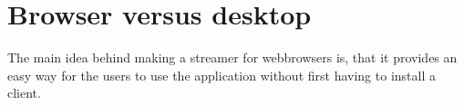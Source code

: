 %
\section{Browser versus desktop}
The main idea behind making a streamer for webbrowsers is, that it provides an easy way for the users to use the application without first having to install a client.
